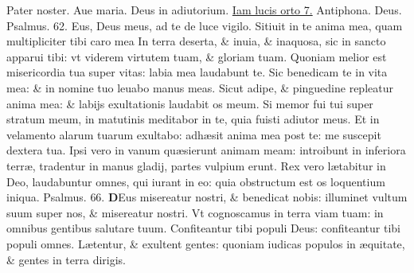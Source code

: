 \documentclass[a5paper,10pt]{book}
\def\ae{æ}
\begin{document}
\begin{multicols*}{2}
\vspace{-1em}
\par \noindent \color{red} P\color{black}ater noster. Aue maria. Deus in adiutorium. \hyperlink{Iamlucis}{Iam lucis orto 7.} \color{red} Antiphona. \color{black} Deus. \color{red} Psalmus. \hypertarget{ps62}{62.} \color{black}
Eus, Deus meus, ad te de luce vigilo.
\newline \color{red} S\color{black}itiuit in te anima mea, quam multipliciter tibi caro mea
\newline \color{red} I\color{black}n terra deserta, \& inuia, \& inaquosa, sic in sancto apparui tibi: vt viderem virtutem tuam, \& gloriam tuam.
\newline \color{red} Q\color{black}uoniam melior est misericordia tua super vitas: labia mea laudabunt te.
\newline \color{red} S\color{black}ic benedicam te in vita mea: \& in nomine tuo leuabo manus meas.
\newline \color{red} S\color{black}icut adipe, \& pinguedine repleatur anima mea: \& labijs exultationis laudabit os meum.
\newline \color{red} S\color{black}i memor fui tui super stratum meum, in matutinis meditabor in te, quia fuisti adiutor meus.
\newline \color{red} E\color{black}t in velamento alarum tuarum exultabo: adh\ae sit anima mea post te: me suscepit dextera tua.
\newline \color{red} I\color{black}psi vero in vanum qu\ae sierunt animam meam: introibunt in inferiora terr\ae , tradentur in manus gladij, partes vulpium erunt.
\newline \color{red} R\color{black}ex vero l\ae tabitur in Deo, laudabuntur omnes, qui iurant in eo: quia obstructum est os loquentium iniqua.
\newline \color{red} Psalmus. \hypertarget{ps66}{66.} \color{black}
\vspace{-.25em}
\lettrine[lines=2]{\bfseries \color{red} D}{}Eus misereatur nostri, \& benedicat nobis: illuminet vultum suum super nos, \& misereatur nostri.
\newline \color{red} V\color{black}t cognoscamus in terra viam tuam: in omnibus gentibus salutare tuum.
\newline \color{red} C\color{black}onfiteantur tibi populi Deus: confiteantur tibi populi omnes.
\newline \color{red} L\color{black}\ae tentur, \& exultent gentes: quoniam iudicas populos in \ae quitate, \& gentes in terra dirigis.

\end{multicols*}
\end{document}
